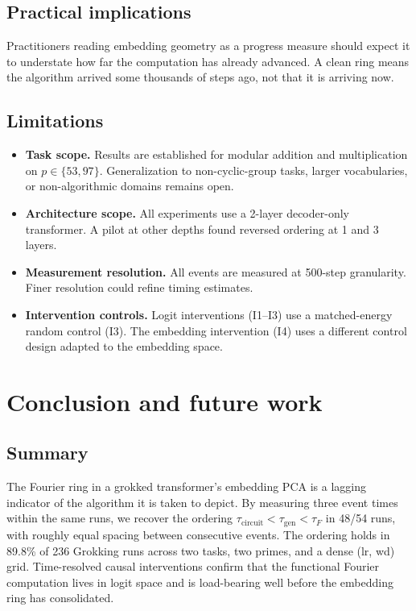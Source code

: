 \documentclass[12pt,openany,a4paper]{book}
\newcommand{\taug}{\tau_{\mathrm{gen}}}
\newcommand{\tauf}{\tau_{F}}
\newcommand{\taucirc}{\tau_{\mathrm{circuit}}}
\begin{document}
\section{Practical implications}

Practitioners reading embedding geometry as a progress measure should expect it to understate how far the computation has already advanced. A clean ring means the algorithm arrived some thousands of steps ago, not that it is arriving now.

\section{Limitations}

\begin{itemize}
  \item \textbf{Task scope.} Results are established for modular addition and multiplication on $p \in \{53, 97\}$. Generalization to non-cyclic-group tasks, larger vocabularies, or non-algorithmic domains remains open.
  \item \textbf{Architecture scope.} All experiments use a 2-layer decoder-only transformer. A pilot at other depths found reversed ordering at 1 and 3 layers.
  \item \textbf{Measurement resolution.} All events are measured at 500-step granularity. Finer resolution could refine timing estimates.
  \item \textbf{Intervention controls.} Logit interventions (I1--I3) use a matched-energy random control (I3). The embedding intervention (I4) uses a different control design adapted to the embedding space.
\end{itemize}


\chapter{Conclusion and future work}
\label{ch:conclusion}

\section{Summary}

The Fourier ring in a grokked transformer's embedding PCA is a lagging indicator of the algorithm it is taken to depict. By measuring three event times within the same runs, we recover the ordering $\taucirc < \taug < \tauf$ in 48/54 runs, with roughly equal spacing between consecutive events. The ordering holds in 89.8\% of 236 Grokking runs across two tasks, two primes, and a dense (lr, wd) grid. Time-resolved causal interventions confirm that the functional Fourier computation lives in logit space and is load-bearing well before the embedding ring has consolidated.
\end{document}
